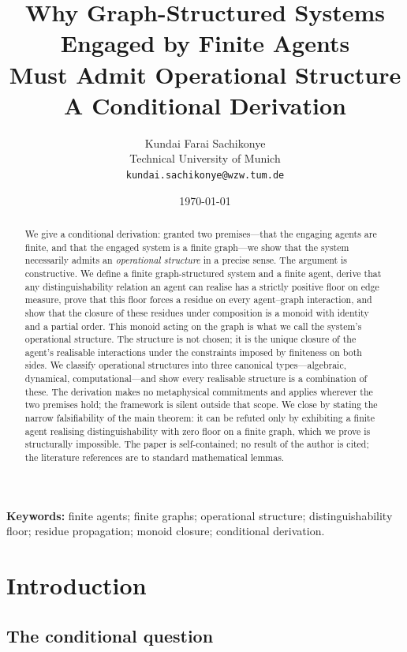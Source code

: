 \documentclass[11pt,a4paper]{article}
\title{\textbf{Why Graph-Structured Systems Engaged by Finite Agents\\
Must Admit Operational Structure}\\[4pt]
\large A Conditional Derivation}
\author{%
Kundai Farai Sachikonye\\
\small Technical University of Munich\\
\small \texttt{kundai.sachikonye@wzw.tum.de}}
\date{\today}
\theoremstyle{thmstyle}
\theoremstyle{definition}
\theoremstyle{remark}
\begin{document}
\maketitle

\begin{abstract}
\noindent
We give a conditional derivation: granted two premises---that the
engaging agents are finite, and that the engaged system is a finite
graph---we show that the system necessarily admits an
\emph{operational structure} in a precise sense. The argument is
constructive. We define a finite graph-structured system and a finite
agent, derive that any distinguishability relation an agent can
realise has a strictly positive floor on edge measure, prove that
this floor forces a residue on every agent--graph interaction, and
show that the closure of these residues under composition is a monoid
with identity and a partial order. This monoid acting on the graph is
what we call the system's operational structure. The structure is
not chosen; it is the unique closure of the agent's realisable
interactions under the constraints imposed by finiteness on both
sides. We classify operational structures into three canonical
types---algebraic, dynamical, computational---and show every
realisable structure is a combination of these. The derivation makes
no metaphysical commitments and applies wherever the two premises
hold; the framework is silent outside that scope. We close by stating
the narrow falsifiability of the main theorem: it can be refuted only
by exhibiting a finite agent realising distinguishability with zero
floor on a finite graph, which we prove is structurally impossible.
The paper is self-contained; no result of the author is cited; the
literature references are to standard mathematical lemmas.
\end{abstract}

\medskip
\noindent\textbf{Keywords:} finite agents; finite graphs; operational
structure; distinguishability floor; residue propagation; monoid
closure; conditional derivation.

\tableofcontents

\section{Introduction}
\label{sec:intro}

\subsection{The conditional question}
\end{document}
